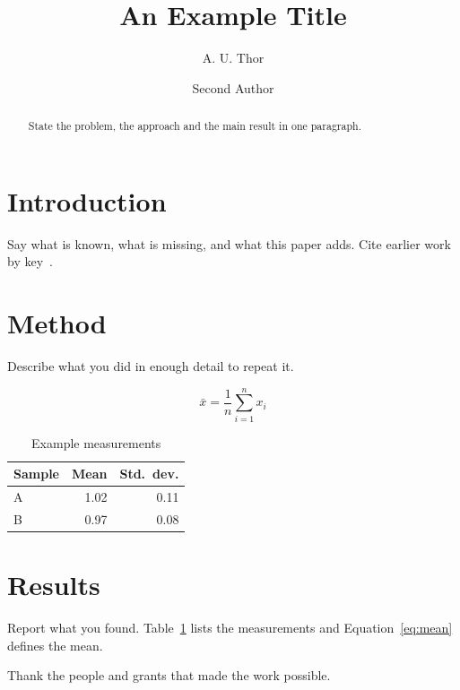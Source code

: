 \documentclass[sigconf,nonacm]{acmart}
\begin{document}
\title{An Example Title}

\author{A. U. Thor}

\author{Second Author}

\begin{abstract}
State the problem, the approach and the main result in one paragraph.
\end{abstract}


\maketitle

\section{Introduction}

Say what is known, what is missing, and what this paper adds. Cite earlier
work by key~\cite{einstein1905,knuth1984}.

\section{Method}

Describe what you did in enough detail to repeat it.

\begin{equation}
  \bar{x} = \frac{1}{n} \sum_{i=1}^{n} x_i
  \label{eq:mean}
\end{equation}

\begin{table}
  \caption{Example measurements}
  \label{tab:results}
  \begin{tabular}{lrr}
    \toprule
    Sample & Mean & Std.\ dev. \\
    \midrule
    A & 1.02 & 0.11 \\
    B & 0.97 & 0.08 \\
    \bottomrule
  \end{tabular}
\end{table}

\section{Results}

Report what you found. Table~\ref{tab:results} lists the measurements and
Equation~\ref{eq:mean} defines the mean.

\begin{acks}
Thank the people and grants that made the work possible.
\end{acks}



\end{document}
